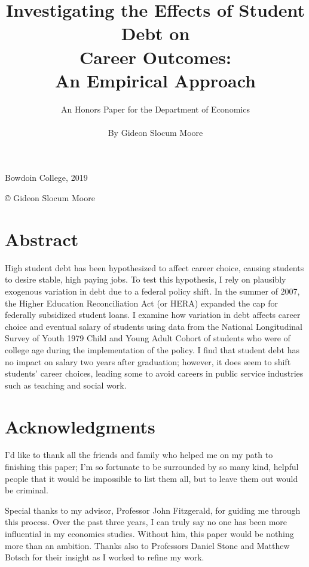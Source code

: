 \documentclass[12pt]{article}
\title{\vfill Investigating the Effects of Student Debt on \\ Career Outcomes: \\ An Empirical Approach \vfill}
\author{An Honors Paper for the Department of Economics \\ \\ By Gideon Slocum Moore}
\date{}
\begin{document}
	{ \maketitle}
	\thispagestyle{empty}
	\vfill
	
	

	\begin{center}
		Bowdoin College, 2019

		\copyright {} Gideon Slocum Moore
	\end{center}

	\vfill

	\pagebreak
	
	\setcounter{page}{1}
	
	\section*{Abstract}
	
	High student debt has been hypothesized to affect career choice, causing students to desire stable, high paying jobs. To test this hypothesis, I rely on plausibly exogenous variation in debt due to a federal policy shift. In the summer of 2007, the Higher Education Reconciliation Act (or HERA) expanded the cap for federally subsidized student loans. I examine how variation in debt affects career choice and eventual salary of students using data from the National Longitudinal Survey of Youth 1979 Child and Young Adult Cohort of students who were of college age during the implementation of the policy. I find that student debt has no impact on salary two years after graduation; however, it does seem to shift students' career choices, leading some to avoid careers in public service industries such as teaching and social work.
	
	\pagebreak
	
	\section*{Acknowledgments}
	
	I'd like to thank all the friends and family who helped me on my path to finishing this paper; I'm so fortunate to be surrounded by so many kind, helpful people that it would be impossible to list them all, but to leave them out would be criminal.
	
	Special thanks to my advisor, Professor John Fitzgerald, for guiding me through this process. Over the past three years, I can truly say no one has been more influential in my economics studies. Without him, this paper would be nothing more than an ambition. Thanks also to Professors Daniel Stone and Matthew Botsch for their insight as I worked to refine my work.
	
\end{document}
